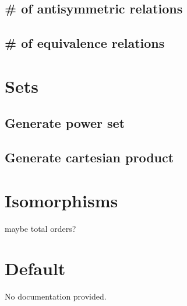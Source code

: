 \documentclass{article}
\begin{document}
\subsection{\# of antisymmetric relations}
\subsection{\# of equivalence relations}

\section{Sets}
\subsection{Generate power set}
\subsection{Generate cartesian product}

\section{Isomorphisms}
maybe total orders?

\section{Default}
No documentation provided.
\end{document}
